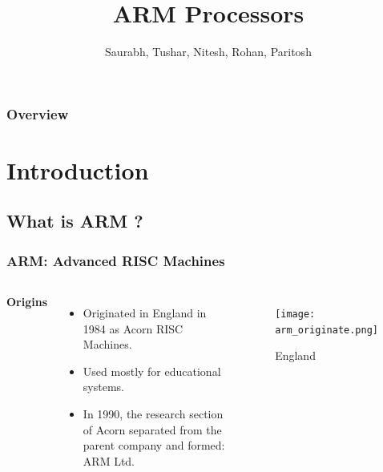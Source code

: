 \documentclass{beamer}
\title[ARM]{ARM Processors} %
\author{Saurabh, Tushar, Nitesh, Rohan, Paritosh} %
\institute[VIT U] %
{
VIT University\\ %
}
\begin{document}
\begin{frame}
\titlepage %
\end{frame}

\begin{frame}
\frametitle{Overview} %
\tableofcontents %
\end{frame}


\section{Introduction} %

\subsection{What is ARM ?} %

\begin{frame}
\frametitle{ARM: Advanced RISC Machines }
\begin{columns}[c] %

\textbf{Origins}
\begin{itemize}
\item Originated in England in 1984 as Acorn RISC Machines.
\item Used mostly for educational systems.
\item In 1990, the research section of Acorn separated from the parent company and formed: ARM Ltd.
\end{itemize}

\begin{figure}
\texttt{[image: arm\_originate.png]}
\caption{England}
\end{figure}

\end{columns}

\end{frame}
\end{document}

